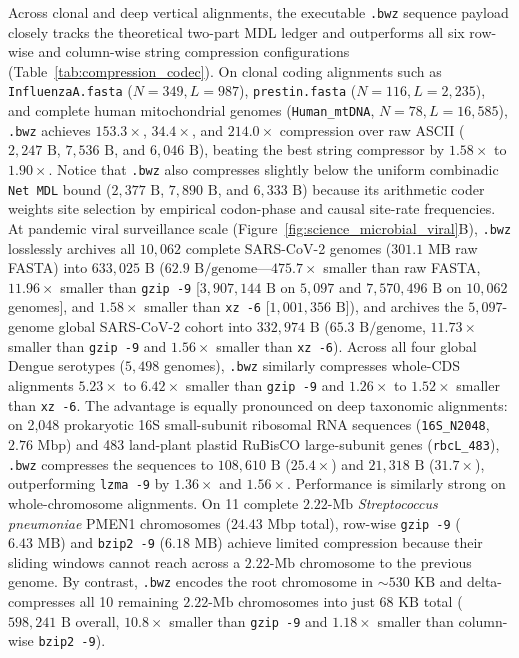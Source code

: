 \documentclass[11pt,a4paper]{article}
\begin{document}
Across clonal and deep vertical alignments, the executable \texttt{.bwz} sequence payload closely tracks the theoretical two-part MDL ledger and outperforms all six row-wise and column-wise string compression configurations (Table~\ref{tab:compression_codec}). On clonal coding alignments such as \texttt{InfluenzaA.fasta} ($N = 349, L = 987$), \texttt{prestin.fasta} ($N = 116, L = 2,235$), and complete human mitochondrial genomes (\texttt{Human\_mtDNA}, $N = 78, L = 16,585$), \texttt{.bwz} achieves $153.3\times$, $34.4\times$, and $214.0\times$ compression over raw ASCII ($2,247\text{ B}$, $7,536\text{ B}$, and $6,046\text{ B}$), beating the best string compressor by $1.58\times$ to $1.90\times$. Notice that \texttt{.bwz} also compresses slightly below the uniform combinadic \texttt{Net MDL} bound ($2,377\text{ B}$, $7,890\text{ B}$, and $6,333\text{ B}$) because its arithmetic coder weights site selection by empirical codon-phase and causal site-rate frequencies. At pandemic viral surveillance scale (Figure~\ref{fig:science_microbial_viral}B), \texttt{.bwz} losslessly archives all $10,062$ complete SARS-CoV-2 genomes ($301.1\text{ MB}$ raw FASTA) into $633,025\text{ B}$ ($62.9\text{ B/genome}$---$475.7\times$ smaller than raw FASTA, $11.96\times$ smaller than \texttt{gzip -9} [$3,907,144\text{ B}$ on $5,097$ and $7,570,496\text{ B}$ on $10,062$ genomes], and $1.58\times$ smaller than \texttt{xz -6} [$1,001,356\text{ B}$]), and archives the $5,097$-genome global SARS-CoV-2 cohort into $332,974\text{ B}$ ($65.3\text{ B/genome}$, $11.73\times$ smaller than \texttt{gzip -9} and $1.56\times$ smaller than \texttt{xz -6}). Across all four global Dengue serotypes ($5,498$ genomes), \texttt{.bwz} similarly compresses whole-CDS alignments $5.23\times$ to $6.42\times$ smaller than \texttt{gzip -9} and $1.26\times$ to $1.52\times$ smaller than \texttt{xz -6}. The advantage is equally pronounced on deep taxonomic alignments: on 2,048 prokaryotic 16S small-subunit ribosomal RNA sequences (\texttt{16S\_N2048}, $2.76\text{ Mbp}$) and 483 land-plant plastid RuBisCO large-subunit genes (\texttt{rbcL\_483}), \texttt{.bwz} compresses the sequences to $108,610\text{ B}$ ($25.4\times$) and $21,318\text{ B}$ ($31.7\times$), outperforming \texttt{lzma -9} by $1.36\times$ and $1.56\times$. Performance is similarly strong on whole-chromosome alignments. On 11 complete $2.22\text{-Mb}$ \textit{Streptococcus pneumoniae} PMEN1 chromosomes ($24.43\text{ Mbp}$ total), row-wise \texttt{gzip -9} ($6.43\text{ MB}$) and \texttt{bzip2 -9} ($6.18\text{ MB}$) achieve limited compression because their sliding windows cannot reach across a $2.22\text{-Mb}$ chromosome to the previous genome. By contrast, \texttt{.bwz} encodes the root chromosome in $\sim 530\text{ KB}$ and delta-compresses all 10 remaining $2.22\text{-Mb}$ chromosomes into just $68\text{ KB}$ total ($598,241\text{ B}$ overall, $10.8\times$ smaller than \texttt{gzip -9} and $1.18\times$ smaller than column-wise \texttt{bzip2 -9}).
\end{document}
